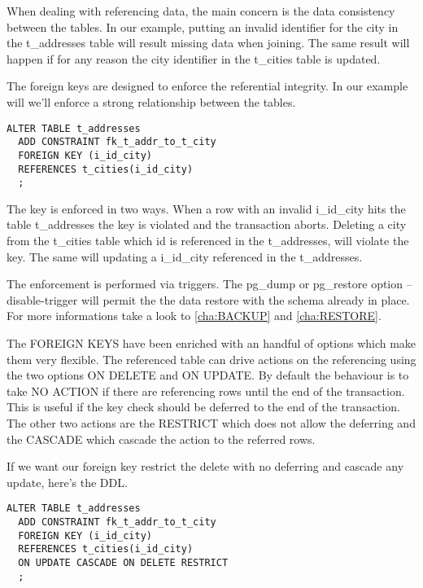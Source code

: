 When dealing with referencing data, the main concern is the data consistency between the tables. 
In our example, putting an invalid identifier for the city in the t\_addresses table will result 
missing data when joining. The same result will happen if for any reason the city identifier in 
the t\_cities table is updated.\newline

The foreign keys are designed to enforce the referential integrity. In our example will we'll 
enforce a strong relationship between the tables.

\begin{lstlisting}[style=pgsql]
ALTER TABLE t_addresses 
  ADD CONSTRAINT fk_t_addr_to_t_city
  FOREIGN KEY (i_id_city)
  REFERENCES t_cities(i_id_city)
  ;

\end{lstlisting}

The key is enforced in two ways. When a row with an invalid i\_id\_city hits the table t\_addresses 
the key is violated and the transaction aborts. Deleting a city from the t\_cities table which id 
is referenced in the t\_addresses, will violate the key. The same will updating a i\_id\_city 
referenced in the t\_addresses.\newline

The enforcement is performed via triggers. The pg\_dump or pg\_restore option --disable-trigger 
will permit the the data restore with the schema already in place. For more informations take a 
look to \ref{cha:BACKUP} and  \ref{cha:RESTORE}.\newline

The FOREIGN KEYS have been enriched with an handful of options which make them very flexible. 
The referenced table can drive actions on the referencing using the two options ON DELETE and ON 
UPDATE. By default the behaviour is to take NO ACTION if there are referencing rows until the 
end of the transaction. This is useful if the key check should be deferred to the end of the 
transaction. The other two actions are the RESTRICT which does not allow the deferring and 
the CASCADE which cascade the action to the referred rows. 

If we want our foreign key restrict the delete with no deferring and cascade any update, here's the 
DDL.

\begin{lstlisting}[style=pgsql]
ALTER TABLE t_addresses 
  ADD CONSTRAINT fk_t_addr_to_t_city
  FOREIGN KEY (i_id_city)
  REFERENCES t_cities(i_id_city)
  ON UPDATE CASCADE ON DELETE RESTRICT
  ;

\end{lstlisting}

